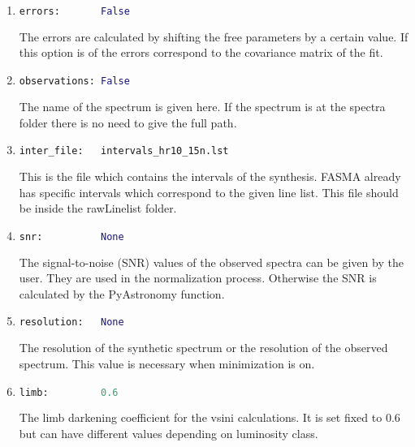 \documentclass[a4paper,10pt]{article}
\begin{document}
\begin{enumerate}
\item
\begin{lstlisting}[language=Python]
errors:       False
\end{lstlisting}
The errors are calculated by shifting the free parameters by a certain value. If this option is of the errors correspond to the covariance matrix of the fit.

\item
\begin{lstlisting}[language=Python]
observations: False
\end{lstlisting}
The name of the spectrum is given here. If the spectrum is at the spectra folder there is no need to give the full path.

\item
\begin{lstlisting}[language=Python]
inter_file:   intervals_hr10_15n.lst
\end{lstlisting}
This is the file which contains the intervals of the synthesis. FASMA already has specific intervals which correspond to the given line list. This file should be inside the rawLinelist folder.

\item
\begin{lstlisting}[language=Python]
snr:          None
\end{lstlisting}
The signal-to-noise (SNR) values of the observed spectra can be given by the user. They are used in the normalization process. Otherwise the SNR is calculated by the PyAstronomy function.

\item
\begin{lstlisting}[language=Python]
resolution:   None
\end{lstlisting}
The resolution of the synthetic spectrum or the resolution of the observed spectrum. This value is necessary when minimization is on.

\item
\begin{lstlisting}[language=Python]
limb:         0.6
\end{lstlisting}
The limb darkening coefficient for the vsini calculations. It is set fixed to 0.6 but can have different values depending on luminosity class.
\end{enumerate}
\end{document}
